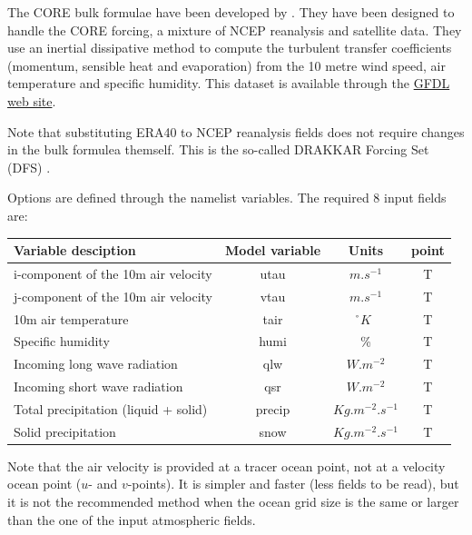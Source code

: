 The CORE bulk formulae have been developed by \citet{Large_Yeager_Rep04}. 
They have been designed to handle the CORE forcing, a mixture of NCEP 
reanalysis and satellite data. They use an inertial dissipative method to compute 
the turbulent transfer coefficients (momentum, sensible heat and evaporation) 
from the 10 metre wind speed, air temperature and specific humidity.
This \citet{Large_Yeager_Rep04} dataset is available through the 
\href{http://nomads.gfdl.noaa.gov/nomads/forms/mom4/CORE.html}{GFDL web site}. 

Note that substituting ERA40 to NCEP reanalysis fields 
does not require changes in the bulk formulea themself. 
This is the so-called DRAKKAR Forcing Set (DFS) \citep{Brodeau_al_OM09}. 

Options are defined through the   namelist variables.
The required 8 input fields are:

\begin{table}[htbp]   \label{Tab_CORE}
\begin{center}
\begin{tabular}{|l|c|c|c|}
\hline
Variable desciption					& Model variable	& Units	 & point \\		\hline
i-component of the 10m air velocity	& utau		& $m.s^{-1}$			& T  \\ 	\hline
j-component of the 10m air velocity	& vtau		& $m.s^{-1}$			& T  \\	\hline
10m air temperature					& tair		& \r{}$K$				& T 	\\	\hline
Specific humidity					& humi		& \%					& T \\		\hline
Incoming long wave radiation		& qlw		& $W.m^{-2}$			& T \\		\hline
Incoming short wave radiation		& qsr		& $W.m^{-2}$			& T \\		\hline
Total precipitation (liquid + solid)	& precip	& $Kg.m^{-2}.s^{-1}$	& T \\ 	\hline
Solid precipitation					& snow		& $Kg.m^{-2}.s^{-1}$	& T \\	\hline
\end{tabular}
\end{center}
\end{table}

Note that the air velocity is provided at a tracer ocean point, not at a velocity ocean 
point ($u$- and $v$-points). It is simpler and faster (less fields to be read), 
but it is not the recommended method when the ocean grid size is the same 
or larger than the one of the input atmospheric fields.

